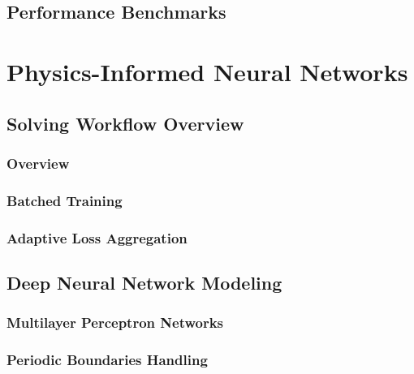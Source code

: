 \documentclass[font=STIX2]{gw-dissertation}[2021/11/19]
\begin{document}
    \section{Performance Benchmarks}\label{sec:petibm-perf}
    

\chapter{Physics-Informed Neural Networks}\label{chap:pinn}

    \section{Solving Workflow Overview}\label{sec:pinn-workflow-overview}

        \subsection{Overview}\label{sec:pinn-overview}
        

        \subsection{Batched Training}\label{sec:batched-training}
        

        \subsection{Adaptive Loss Aggregation}\label{sec:loss-annealing}
        

    \section{Deep Neural Network Modeling}\label{sec:pinn-dnnm}

        \subsection{Multilayer Perceptron Networks}\label{sec:mlp}
        

        \subsection{Periodic Boundaries Handling}\label{sec:periodic-boundary}
        
\end{document}
